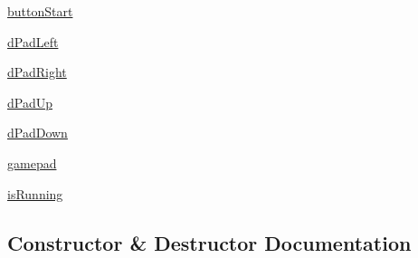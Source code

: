 \begin{DoxyCompactItemize}
\item 
\hyperlink{classmodel_1_1LOGITECH__GAMEPAD__MODEL_1_1LogitechGamepadModel_ab794dea015179ef967b0a7158155f875}{button\+Start}
\item 
\hyperlink{classmodel_1_1LOGITECH__GAMEPAD__MODEL_1_1LogitechGamepadModel_a4d4a5ae309e7d6442204e1206f2bf390}{d\+Pad\+Left}
\item 
\hyperlink{classmodel_1_1LOGITECH__GAMEPAD__MODEL_1_1LogitechGamepadModel_a82934ed6d614ab974ab4ca2fe1488933}{d\+Pad\+Right}
\item 
\hyperlink{classmodel_1_1LOGITECH__GAMEPAD__MODEL_1_1LogitechGamepadModel_a260b07781293ab823c5f1963fcd40d03}{d\+Pad\+Up}
\item 
\hyperlink{classmodel_1_1LOGITECH__GAMEPAD__MODEL_1_1LogitechGamepadModel_a63f6d8dc05a0884eaebc6d2a1f8b62f0}{d\+Pad\+Down}
\item 
\hyperlink{classmodel_1_1LOGITECH__GAMEPAD__MODEL_1_1LogitechGamepadModel_a77eb2ddae3b91d8da8845214893c118d}{gamepad}
\item 
\hyperlink{classmodel_1_1LOGITECH__GAMEPAD__MODEL_1_1LogitechGamepadModel_a6c98021d546456249760f86386c7d406}{is\+Running}
\end{DoxyCompactItemize}


\subsection{Constructor \& Destructor Documentation}
\hypertarget{classmodel_1_1LOGITECH__GAMEPAD__MODEL_1_1LogitechGamepadModel_a78c8eb4ec8b24bb9b7b3b5f8b89b1ae4}{}
